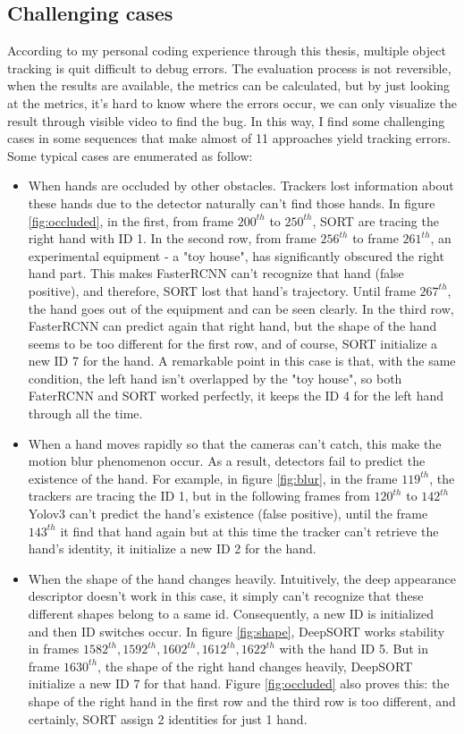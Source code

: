 \subsection{Challenging cases}
According to my personal coding experience through this thesis, multiple object tracking is quit difficult to debug errors. The evaluation process is not reversible, when the results are available, the metrics can be calculated, but by just looking at the metrics, it’s hard to know where the errors occur, we can only visualize the result through visible video to find the bug. In this way, I find some challenging cases in some sequences that make almost of 11 approaches yield tracking errors. Some typical cases are enumerated as follow:
\begin{itemize}
	\item When hands are occluded by other obstacles. Trackers lost information about these hands due to the detector naturally can't find those hands. In figure \ref{fig:occluded}, in the first, from frame \(200^{th}\) to \(250^{th}\), SORT are tracing the right hand with ID 1. In the second row, from frame \(256^{th}\) to frame \(261^{th}\), an experimental equipment - a "toy house", has significantly obscured the right hand part. This makes FasterRCNN can't recognize that hand (false positive), and therefore, SORT lost that hand's trajectory. Until frame \(267^{th}\), the hand goes out of the equipment and can be seen clearly. In the third row, FasterRCNN can predict again that right hand, but the shape of the hand seems to be too different for the first row, and of course, SORT initialize a new ID 7 for the hand. A remarkable point in this case is that, with the same condition, the left hand isn't overlapped by the "toy house", so both FaterRCNN and SORT worked perfectly, it keeps the ID 4 for the left hand through all the time.
	\item When a hand moves rapidly so that the cameras can’t catch, this make the motion blur phenomenon occur. As a result, detectors fail to predict the existence of the hand. For example, in figure \ref{fig:blur}, in the frame \(119^{th}\), the trackers are tracing the ID 1, but in the following frames from \(120^{th}\) to \(142^{th}\) Yolov3 can't predict the hand's existence (false positive), until the frame \(143^{th}\) it find that hand again but at this time the tracker can't retrieve the hand's identity, it initialize a new ID 2 for the hand.
	\item When the shape of the hand changes heavily. Intuitively, the deep appearance descriptor doesn't work in this case, it simply can't recognize that these different shapes belong to a same id. Consequently, a new ID is initialized and then ID switches occur. In figure \ref{fig:shape}, DeepSORT works stability in frames \(1582^{th}, 1592^{th}, 1602^{th}, 1612^{th}, 1622^{th}\) with the hand ID 5. But in frame \(1630^{th}\), the shape of the right hand changes heavily, DeepSORT initialize a new ID 7 for that hand. Figure \ref{fig:occluded} also proves this: the shape of the right hand in the first row and the third row is too different, and certainly, SORT assign 2 identities for just 1 hand.

\end{itemize}
